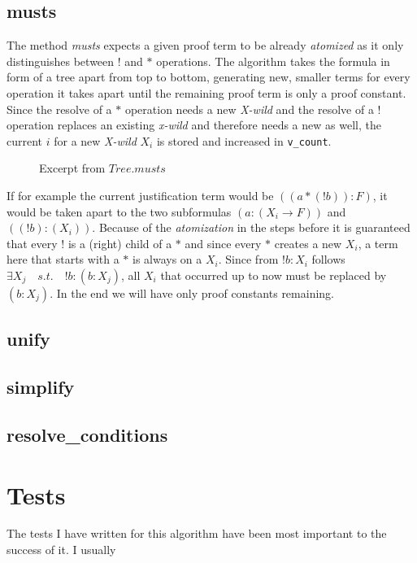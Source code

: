 \subsection{musts}

The method \emph{musts} expects a given proof term to be already \emph{atomized} as it only distinguishes between $!$ and $*$ operations.
The algorithm takes the formula in form of a tree apart from top to bottom, generating new, smaller terms for every operation it takes apart until the remaining proof term is only a proof constant. Since the resolve of a $*$ operation needs a new \emph{X-wild} and the resolve of a $!$ operation replaces an existing \emph{x-wild} and therefore needs a new as well, the current $i$ for a new \emph{X-wild} $X_i$ is stored and increased in \texttt{v\_count}.

\begin{figure}[H]
    \vspace{-10pt}
	
	\vspace{-10pt}
	\caption{Excerpt from $Tree.musts$}
	\vspace{-10pt}
\end{figure}

If for example the current justification term would be $((a*(!b)):F)$, it would be taken apart to the two subformulas $(a:(X_i\rightarrow F))$ and $((!b):(X_i))$. Because of the \emph{atomization} in the steps before it is guaranteed that every $!$ is a (right) child of a  $*$ and since every $*$ creates a new $X_i$, a term here that starts with a $*$ is always on a $X_i$. Since from $!b:X_i$ follows $\exists X_j \quad s.t. \quad !b:(b:X_j)$, all $X_i$ that occurred up to now must be replaced by $(b:X_j)$. In the end we will have only proof constants remaining.

\subsection{unify}

\subsection{simplify}

\subsection{resolve_conditions}


\section{Tests}
The tests I have written for this algorithm have been most important to the success of it. I usually 
